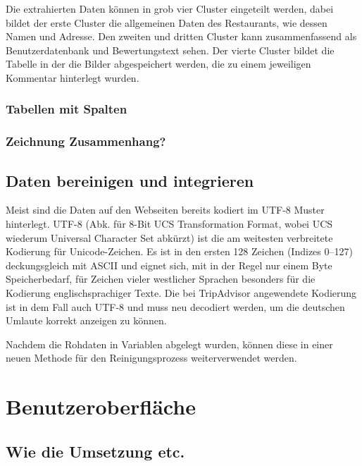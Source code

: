 \documentclass[a4paper,oneside,12pt]{report}
\begin{document}
				Die extrahierten Daten können in grob vier Cluster eingeteilt werden, dabei bildet der erste Cluster die allgemeinen Daten des Restaurants, wie dessen Namen und Adresse. Den zweiten und dritten Cluster kann zusammenfassend als Benutzerdatenbank und Bewertungstext sehen. Der vierte Cluster bildet die Tabelle in der die Bilder abgespeichert werden, die zu einem jeweiligen Kommentar hinterlegt wurden.
				
				\subsubsection{Tabellen mit Spalten}
			
				\subsubsection{Zeichnung Zusammenhang?}


			\subsection{Daten bereinigen und integrieren}
				
				Meist sind die Daten auf den Webseiten bereits kodiert im UTF-8 Muster hinterlegt. UTF-8 (Abk. für 8-Bit UCS Transformation Format, wobei UCS wiederum Universal Character Set abkürzt) ist die am weitesten verbreitete Kodierung für Unicode-Zeichen. Es ist in den ersten 128 Zeichen (Indizes 0–127) deckungsgleich mit ASCII und eignet sich, mit in der Regel nur einem Byte Speicherbedarf, für Zeichen vieler westlicher Sprachen besonders für die Kodierung englischsprachiger Texte. \cite{bib-utf8} Die bei TripAdvisor angewendete Kodierung ist in dem Fall auch UTF-8 und muss neu decodiert werden, um die deutschen Umlaute korrekt anzeigen zu können.
				
				Nachdem die Rohdaten in Variablen abgelegt wurden, können diese in einer neuen Methode für den Reinigungsprozess weiterverwendet werden.
			
			
				
				
				
		\section{Benutzeroberfläche}
		
			\subsection{Wie die Umsetzung etc.}
			
\end{document}
